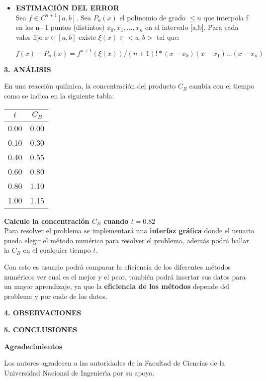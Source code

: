 \documentclass[10pt,a4paper]{article}
\begin{document}
\begin{multicols}{2}
\begin{itemize}
	\item \textbf{ESTIMACIÓN DEL ERROR}\\
	Sea $f\in C^{n+1}[a,b]$. Sea $P_n(x)$ el polinomio de grado $\leq n$ que interpola f en los n+1 puntos (distintos) $x_0, x_1, ..., x_n$ en el intervalo [a,b]. Para cada valor fijo $x\in [a,b]$ existe $\xi (x) \in <a,b>$ tal que:
	
	 $f(x)-P_n(x) = f^{n+1}(\xi (x))/(n+1)! * (x-x_0)(x-x_1)...(x-x_n)$

\end{itemize}

\begin{center}
	{\large \bf 3. ANÁLISIS}
	
\end{center}

\noindent En una reacción quiímica, la concentración del producto $C_B$ cambia con el tiempo como se indica en la siguiente tabla:


\begin{center}
	\begin{tabular}{ |c|c| }
		\hline
		$t$ & $C_B$ \\ \hline
		0.00 & 0.00 \\ \hline
		0.10 & 0.30 \\ \hline
		0.40 & 0.55 \\ \hline
		0.60 & 0.80 \\ \hline
		0.80 & 1.10 \\ \hline
		1.00 & 1.15 \\ \hline
	\end{tabular}
\end{center}

\textbf{Calcule la concentración $C_B$ cuando $t = 0.82$}\\

		
\noindent Para resolver el problema se implementará una \textbf{interfaz gráfica} donde el usuario pueda elegir el método numérico para resolver el problema, además podrá hallar la $C_B$ en el cualquier tiempo $t$.  

\noindent Con esto es usuario podrá comparar la eficiencia de los diferentes métodos numéricos ver cual es el mejor y el peor, también podrá insertar sus datos para un mayor aprendizaje, ya que la \textbf{eficiencia de los métodos} depende del problema y por ende de los datos.

\begin{center}
{\large \bf 4. OBSERVACIONES}
\end{center}

\begin{center}
{\large \bf 5. CONCLUSIONES}
\end{center}

\begin{center}
{\large \bf Agradecimientos}
\end{center}
Los autores agradecen a las autoridades de la Facultad de Ciencias de la Universidad Nacional de 
Ingenier\'{\i}a por su apoyo.

\end{multicols}
\newpage
\end{document}
